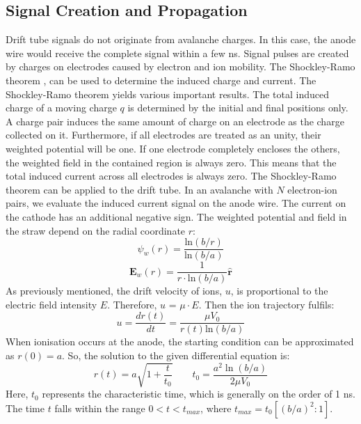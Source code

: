 \subsection{Signal Creation and Propagation}
Drift tube signals do not originate from avalanche charges. In this case, the anode wire would 
receive the complete signal within a few ns. Signal pulses are created by charges on electrodes 
caused by electron and ion mobility. The Shockley-Ramo theorem \cite{kola}, can be 
used to determine the induced charge and current. 
The Shockley-Ramo theorem yields various important results. The total induced charge of a moving charge 
$q$ is determined by the initial and final positions only.  A charge pair induces the same amount of 
charge on an electrode as the charge collected on it. Furthermore, if all electrodes are treated as 
an unity, their weighted potential will be one. 
If one electrode completely encloses the others, the weighted field in the contained region is always zero. 
This means that the total induced current across all electrodes is always zero. The Shockley-Ramo theorem can 
be applied to the drift tube. In an avalanche with $N$ electron-ion pairs, we evaluate the induced current 
signal on the anode wire. The current on the cathode has an additional negative sign. The weighted 
potential and field in the straw depend on the radial coordinate $r$:
\begin{equation}
    \psi_w(r)=\frac{\text{ln}(b/r)}{\text{ln}(b/a)}
\end{equation}
\begin{equation}
    \textbf{E}_w(r)=\frac{1}{r \cdot \text{ln}(b/a)}\hat{\textbf{r}}
\end{equation}
As previously mentioned, the drift velocity of ions, $u$, is proportional to the electric field intensity $E$. Therefore, $u$ = $\mu \cdot E$. 
Then the ion trajectory fulfils:
\begin{equation}
    u=\frac{dr(t)}{dt}=\frac{\mu V_0}{r(t)\text{ln}(b/a)}
\end{equation}
When ionisation occurs at the anode, the starting condition can be approximated as $r(0) = a$. So, the solution to the given differential equation is:
 \begin{equation}
    r(t)=a \sqrt{1+\frac{t}{t_0}} \qquad t_0=\frac{a^2 \ln (b / a)}{2 \mu V_0}
    \end{equation}
Here, $t_0$ represents the characteristic time, which is generally on the order of 1 ns. 
The time $t$ falls within the range $0 < t < t_{max}$, where $t_{max} = t_0 [(b/a)^2: 1]$. 
